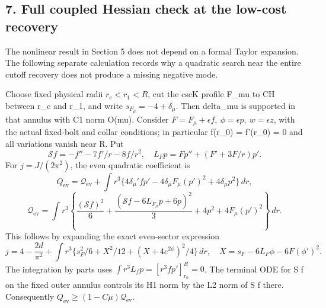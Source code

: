 \documentclass[
  10pt,
]{article}
\begin{document}
\hypertarget{full-coupled-hessian-check-at-the-low-cost-recovery}{%
\subsection{7. Full coupled Hessian check at the low-cost
recovery}\label{full-coupled-hessian-check-at-the-low-cost-recovery}}

The nonlinear result in Section 5 does not depend on a formal Taylor
expansion. The following separate calculation records why a quadratic
search near the entire cutoff recovery does not produce a missing
negative mode.

Choose fixed physical radii \(r_c<r_1<R\), cut the cscK profile F\_mu to
CH between r\_c and r\_1, and write \(s_{F_\mu}=-4+\delta_\mu\). Then
delta\_mu is supported in that annulus with C1 norm O(mu). Consider
\(F=F_\mu+\epsilon f,\ \phi=\epsilon p,\ w=\epsilon z\), with the actual
fixed-bolt and collar conditions; in particular f(r\_0) = f'(r\_0) = 0
and all variations vanish near R. Put \[
 \mathcal Sf=-f''-7f'/r-8f/r^2,\quad
 L_Fp=Fp''+(F'+3F/r)p'.
\] For \(j=J/(2\pi^2)\), the even quadratic coefficient is \[
 Q_{\mathrm{ev}}=\mathcal Q_{\mathrm{ev}}
 +\int r^3\{4\delta_\mu'fp'-4\delta_\mu F_\mu(p')^2
                                      +4\delta_\mu p^2\}\,dr,
\] \[
 \mathcal Q_{\mathrm{ev}}=\int r^3
 \left\{\frac{(\mathcal Sf)^2}{6}
 +\frac{(\mathcal Sf-6L_{F_\mu}p+6p)^2}{3}
                            +4p^2+4F_\mu(p')^2\right\}\,dr.
                                                               \tag{7.1}
\] This follows by expanding the exact even-sector expression \[
 j=4-\frac{2d}{\pi^2}+\int r^3
       \{s_F^2/6+X^2/12+(X+4e^{2\phi})^2/4\}\,dr,
 \quad X=s_F-6L_F\phi-6F(\phi')^2.
\] The integration by parts uses \(\int r^3L_fp=[r^3fp']_{r_0}^{R}=0\).
The terminal ODE for S f on the fixed outer annulus controls its H1 norm
by the L2 norm of S f there. Consequently
\(Q_{\mathrm{ev}}\ge(1-C\mu)\mathcal Q_{\mathrm{ev}}\).
\end{document}
